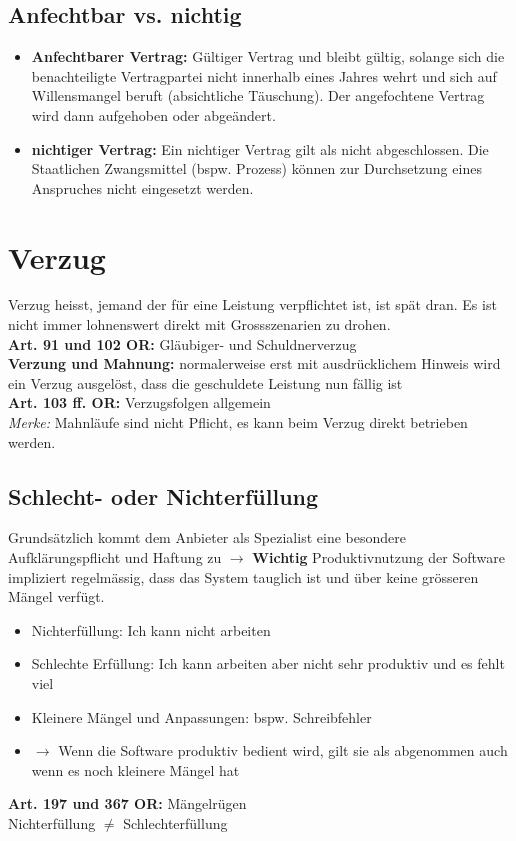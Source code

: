 \documentclass{report}
\theoremstyle{definition}
\theoremstyle{example}
\begin{document}
\subsection{Anfechtbar vs. nichtig}
\begin{itemize}
   \item \textbf{Anfechtbarer Vertrag:} Gültiger Vertrag und bleibt gültig, solange sich die benachteiligte Vertragpartei nicht innerhalb eines Jahres wehrt und sich auf Willensmangel beruft (absichtliche Täuschung). Der angefochtene Vertrag wird dann aufgehoben oder abgeändert.
   \item \textbf{nichtiger Vertrag:} Ein nichtiger Vertrag gilt als nicht abgeschlossen. Die Staatlichen Zwangsmittel (bspw. Prozess) können zur Durchsetzung eines Anspruches nicht eingesetzt werden.
\end{itemize}

\section{Verzug}
Verzug heisst, jemand der für eine Leistung verpflichtet ist, ist spät dran. Es ist nicht immer lohnenswert direkt mit Grossszenarien zu drohen.\\
\textbf{Art. 91 und 102 OR:} Gläubiger- und Schuldnerverzug\\
\textbf{Verzung und Mahnung:} normalerweise erst mit ausdrücklichem Hinweis wird ein Verzug ausgelöst, dass die geschuldete Leistung nun fällig ist\\
\textbf{Art. 103 ff. OR:} Verzugsfolgen allgemein\\
\textit{Merke:} Mahnläufe sind nicht Pflicht, es kann beim Verzug direkt betrieben werden.


\subsection{Schlecht- oder Nichterfüllung}
Grundsätzlich kommt dem Anbieter als Spezialist eine besondere Aufklärungspflicht und Haftung zu $\rightarrow$ 
\textbf{Wichtig} Produktivnutzung der Software impliziert regelmässig, dass das System tauglich ist und über keine grösseren Mängel verfügt.
\begin{itemize}
   \item Nichterfüllung: Ich kann nicht arbeiten
   \item Schlechte Erfüllung: Ich kann arbeiten aber nicht sehr produktiv und es fehlt viel
   \item Kleinere Mängel und Anpassungen: bspw. Schreibfehler
   \item $\rightarrow$ Wenn die Software produktiv bedient wird, gilt sie als abgenommen auch wenn es noch kleinere Mängel hat
\end{itemize}
\textbf{Art. 197 und 367 OR:} Mängelrügen \\
Nichterfüllung $\neq$ Schlechterfüllung\\
\end{document}
